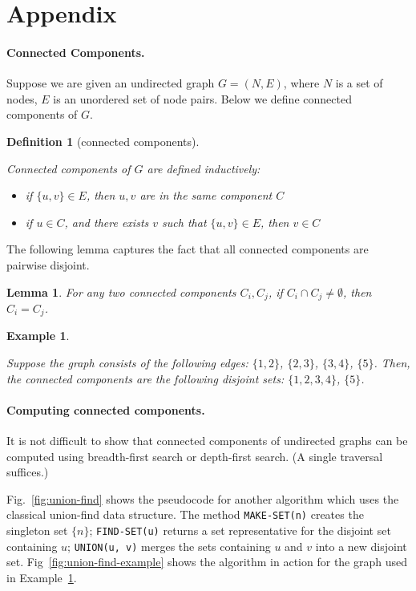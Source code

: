 \documentclass{article}[12pt]
\numberwithin{figure}{section}
\newtheorem{definition}{Definition}[section]
\newtheorem{lemma}{Lemma}[section]
\newtheorem{example}{Example}[section]
\begin{document}
\section{Appendix}\label{sect:appendix}

\paragraph{Connected Components.}

Suppose we are given an undirected graph $G = (N, E)$, where $N$ is a set of nodes, $E$ is an unordered set of node pairs.
Below we define connected components of $G$.
\begin{definition}[connected components]\label{def:cc}
\rm

Connected components of $G$ are defined inductively:
\begin{itemize}
\item if $\{u, v\} \in E$, then $u,v$ are in the same component $C$
\item if $u \in C$, and there exists $v$ such that $\{u, v\} \in E$, then $v \in C$
\end{itemize}
\end{definition}
The following lemma captures the fact that all connected components are pairwise disjoint.
\begin{lemma}\label{lemma:cc-disjoint}
For any two connected components $C_i, C_j$, if $C_i \cap C_j \neq \emptyset$, then $C_i = C_j$.
\end{lemma}

\begin{example}\label{example:cc}
\rm

Suppose the graph consists of the following edges: $\{1,2\}$, $\{2,3\}$, $\{3,4\}$, $\{5\}$.
Then, the connected components are the following disjoint sets: $\{1,2,3,4\}$, $\{5\}$.
\end{example}

\paragraph{Computing connected components.}

It is not difficult to show that connected components of undirected graphs can be computed using breadth-first search or depth-first search.
(A single traversal suffices.)

Fig.~\ref{fig:union-find} shows the pseudocode for another algorithm which uses the classical union-find data structure.
The method \lstinline{MAKE-SET(n)} creates the singleton set $\{n\}$; \lstinline{FIND-SET(u)} returns a set representative for
the disjoint set containing $u$;  \lstinline{UNION(u, v)} merges the sets containing $u$ and $v$ into a new disjoint set.
Fig~\ref{fig:union-find-example} shows the algorithm in action for the graph used in Example~\ref{example:cc}.
\end{document}
